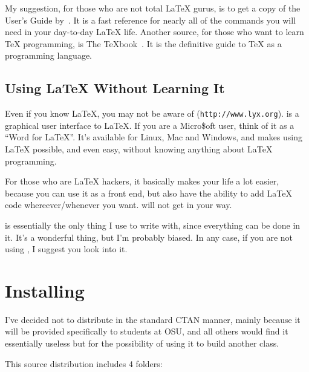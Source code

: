 My suggestion, for those who are not total \LaTeX{} gurus, is to get
a copy of the User's Guide by~\citet{lamport.94:LaTeX}. It is a
fast reference for nearly all of the commands you will need in your
day-to-day \LaTeX{} life. Another source, for those who want to learn
\TeX{} programming, is The \TeX{}book~\citep{knuth.84:TeXbook}.
It is the definitive guide to \TeX{} as a programming language.


\subsection{Using \LaTeX{} Without Learning It}

Even if you know \LaTeX{}, you may not be aware of \LyX{} (\texttt{http://www.lyx.org}).
\LyX{} is a graphical user interface to \LaTeX{}. If you are a Micro\$oft
user, think of it as a {}``Word for \LaTeX{}''. It's available for
Linux, Mac and Windows, and makes using \LaTeX{} possible, and even
easy, without knowing anything about \LaTeX{} programming.

For those who are \LaTeX{} hackers, it basically makes your life a
lot easier, because you can use it as a front end, but also have the
ability to add \LaTeX{} code whereever/whenever you want. \LyX{} will
not get in your way.

\LyX{} is essentially the only thing I use to write with, since everything
can be done in it. It's a wonderful thing, but I'm probably biased.
In any case, if you are not using \LyX{}, I suggest you look into
it.


\section{Installing \beavtex}

I've decided not to distribute \beavtex in the standard CTAN manner,
mainly because it will be provided specifically to students at OSU,
and all others would find it essentially useless but for the possibility
of using it to build another class. 

This source distribution includes 4 folders: 

